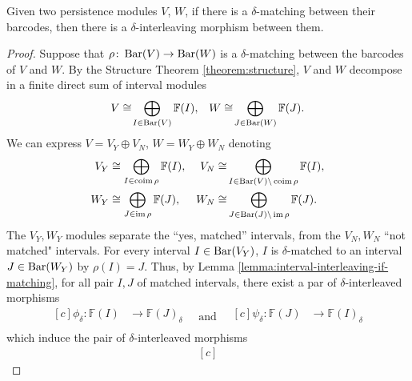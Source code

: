 \begin{proposition}\label{prop:interleaving-if-matching} 
    Given two persistence modules $ V $, $ W $, if there is a $ \delta$-matching between their barcodes, then there is a $ \delta$-interleaving morphism between them.
\end{proposition}
\begin{proof}
    Suppose that $\rho\colon \operatorname{Bar} (V) \to \operatorname{Bar} (W) $ is a $\delta$-matching between the barcodes of $ V $ and $ W $. By the Structure Theorem \ref{theorem:structure}, $ V $ and $ W $ decompose in a finite direct sum of interval modules
    \begin{align}
        V \cong \! \bigoplus_{I \in \operatorname{Bar} (V)} \mathbb F (I),& &W \cong \! \bigoplus_{J \in  \operatorname{Bar} (W)} \mathbb F (J) .
    \end{align}
    We can express $ V = V_Y \oplus V_N $, $ W = W_Y \oplus W_N $ denoting
    \begin{align}
        V_Y &\cong \bigoplus_{I \in  \operatorname{coim} \rho} \mathbb F (I),& V_N \cong &\bigoplus_{I \in \operatorname{Bar}(V) \backslash \operatorname{coim} \rho} \mathbb F (I),\\
        W_Y &\cong \bigoplus_{J \in  \operatorname{im} \rho} \mathbb F (J),& W_N \cong &\bigoplus_{J \in \operatorname{Bar}(J) \backslash \operatorname{im} \rho} \mathbb F (J).
    \end{align}
    The $ V_Y, W_Y $ modules separate the ``yes, matched'' intervals, from the $ V_N, W_N $ ``not matched" intervals. For every interval $ I \in \operatorname{Bar}(V_Y) $, $ I $ is $\delta$-matched to an interval $ J \in \operatorname{Bar}(W_Y)$ by $\rho(I) = J $. Thus, by Lemma \ref{lemma:interval-interleaving-if-matching}, for all pair $ I, J $ of matched intervals, there exist a par of $\delta$-interleaved morphisms
    \begin{equation*}
        \begin{aligned}[c]
        \phi_\delta\colon \mathbb F(I) &\to \mathbb F(J)_\delta\\
        \end{aligned}
        \quad \text{and} \quad
        \begin{aligned}[c]
        \psi_\delta\colon \mathbb F(J) &\to \mathbb F(I)_\delta\\
        \end{aligned}
    \end{equation*}
    which induce the pair of $\delta$-interleaved morphisms
    \begin{equation*}
        \begin{aligned}[c]

\end{aligned}
\end{equation*}
\end{proof}
